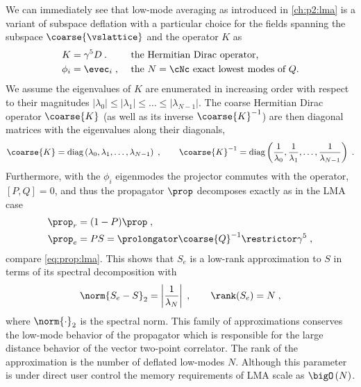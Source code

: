 We can immediately see that low-mode averaging as introduced in \cref{ch:p2:lma} is a variant of subspace deflation with a particular choice for the fields spanning the subspace $\coarse{\vslattice}$ and the operator $K$ as
\begin{align}
K &= \gamma^{5} D \:.  &  &\text{ the Hermitian Dirac operator,} \\
\phi_i &= \evec_i \;,  &  &\text{ the $N=\cNc$ exact lowest modes of $Q$.}
\end{align}
We assume the eigenvalues of $K$ are enumerated in increasing order with respect to their magnitudes $\lvert \lambda_0 \rvert \leq \lvert \lambda_1 \rvert \leq \ldots \leq \lvert \lambda_{N-1} \rvert$.
The coarse Hermitian Dirac operator $\coarse{K}$ (as well as its inverse $\coarse{K}^{-1}$) are then diagonal matrices with the eigenvalues along their diagonals,
\begin{equation} \label{eq:sd:lma:diagonal:dirac}
\coarse{K} = \text{diag}\left(\lambda_0, \lambda_1, \ldots, \lambda_{N-1}\right) \;,
\qquad
\coarse{K}^{-1} = \text{diag}\left(\frac{1}{\lambda_0}, \frac{1}{\lambda_1}, \ldots, \frac{1}{\lambda_{N-1}}\right) \;.
\end{equation}
Furthermore, with the $\phi_i$ eigenmodes the projector commutes with the operator, $[P,Q]=0$, and thus the propagator $\prop$ decomposes exactly as in the LMA case
\begin{align}
\prop_{r} &= (1-P) \prop \;, \\
\prop_{e} &= PS = \prolongator \coarse{Q}^{-1} \restrictor \gamma^5 \;,
\end{align}
compare \cref{eq:prop:lma}.
This shows that $S_e$ is a low-rank approximation to $S$ in terms of its spectral decomposition with
\begin{equation}
\norm{S_e - S}_2
 = \left\lvert \frac{1}{\lambda_{N}} \right\rvert \;,
\qquad
\rank(S_e) = N \;,
\end{equation}
where $\norm{\cdot}_2$ is the spectral norm.
This family of approximations conserves the low-mode behavior of the propagator which is responsible for the large distance behavior of the vector two-point correlator.
The rank of the approximation is the number of deflated low-modes $N$.
Although this parameter is under direct user control the memory requirements of LMA scale as $\bigO\left( N \right)$.

